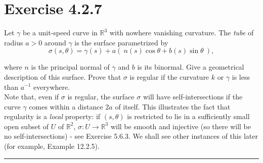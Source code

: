 \documentclass[12pt]{article}
\begin{document}
\maketitle

\section*{Exercise 4.2.7}
\indent

Let $\gamma$ be a unit-speed curve in $\mathbb{R}^3$ with nowhere vanishing curvature. The \emph{tube} of radius $a > 0$ around $\gamma$ is the surface parametrized by
$$
\sigma(s,\theta) = \gamma(s) + a( \ n(s)\cos \theta + b(s) \sin \theta \ ),
$$

where $n$ is the principal normal of $\gamma$ and $b$ is its binormal. Give a geometrical description of this surface. Prove that $\sigma$ is regular if the curvature $k$ or $\gamma$ is less than $a^{-1}$ everywhere.\\

Note that, even if $\sigma$ is regular, the surface $\sigma$ will have self-intersections if the curve $\gamma$ comes within a distance $2a$ of itself. This illustrates the fact that regularity is a \emph{local} property: if $(s,\theta)$ is restricted to lie in a sufficiently small open subset of $U$ of $\mathbb{R}^2$, $\sigma : U \rightarrow \mathbb{R}^3$ will be smooth and injective (so there will be no self-intersections) - see Exercise 5.6.3. We shall see other instances of this later (for example, Example 12.2.5).

\vspace{1cm}
\hrule
\vspace{1cm}
\noindent
\end{document}
